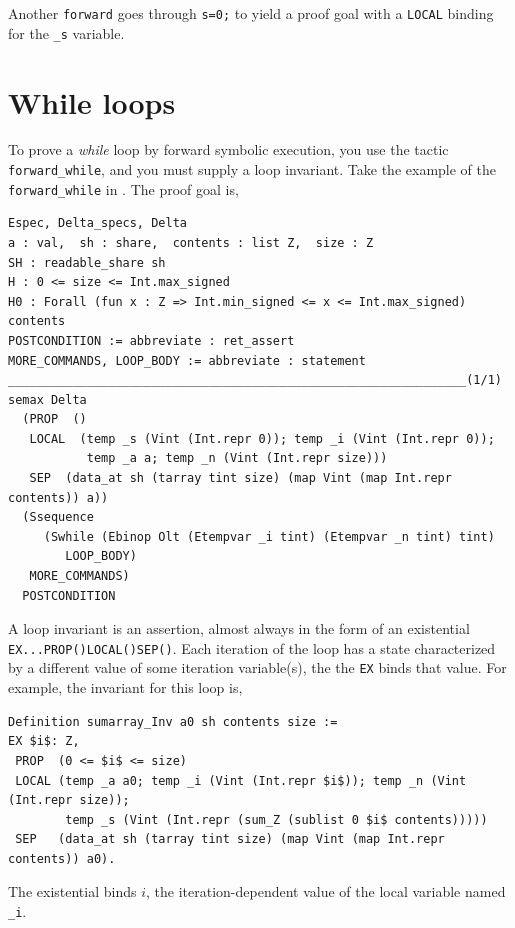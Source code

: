 \documentclass[12pt,fleqn,openany,oneside,showtrims]{memoir}
\begin{document}
Another \lstinline{forward} goes through
\lstinline{s=0;} to yield a proof goal
with a \lstinline{LOCAL} binding for the \lstinline{_s}
variable.

\chapter{While loops}
To prove a \emph{while} loop by forward symbolic execution,
you use the tactic \lstinline{forward_while}, and you
must supply a loop invariant.  Take the example
of the \lstinline{forward_while} in
.  The proof goal is,
\begin{lstlisting}
Espec, Delta_specs, Delta
a : val,  sh : share,  contents : list Z,  size : Z
SH : readable_share sh
H : 0 <= size <= Int.max_signed
H0 : Forall (fun x : Z => Int.min_signed <= x <= Int.max_signed) contents
POSTCONDITION := abbreviate : ret_assert
MORE_COMMANDS, LOOP_BODY := abbreviate : statement
________________________________________________________________(1/1)
semax Delta
  (PROP  ()
   LOCAL  (temp _s (Vint (Int.repr 0)); temp _i (Vint (Int.repr 0));
           temp _a a; temp _n (Vint (Int.repr size)))
   SEP  (data_at sh (tarray tint size) (map Vint (map Int.repr contents)) a))
  (Ssequence
     (Swhile (Ebinop Olt (Etempvar _i tint) (Etempvar _n tint) tint)
        LOOP_BODY)
   MORE_COMMANDS)
  POSTCONDITION  
\end{lstlisting}

A loop invariant is an assertion, almost always in the form
of an existential \lstinline{EX...PROP()LOCAL()SEP()}.
Each iteration of the loop has a state characterized by
a different value of some iteration variable(s),
the the \lstinline{EX} binds that value.
For example, the invariant for this loop is,
\begin{lstlisting}
Definition sumarray_Inv a0 sh contents size := 
EX $i$: Z,
 PROP  (0 <= $i$ <= size)
 LOCAL (temp _a a0; temp _i (Vint (Int.repr $i$)); temp _n (Vint (Int.repr size));
        temp _s (Vint (Int.repr (sum_Z (sublist 0 $i$ contents)))))
 SEP   (data_at sh (tarray tint size) (map Vint (map Int.repr contents)) a0).
\end{lstlisting}
The existential binds $i$, the iteration-dependent value
of the local variable named \lstinline{_i}.
\end{document}
